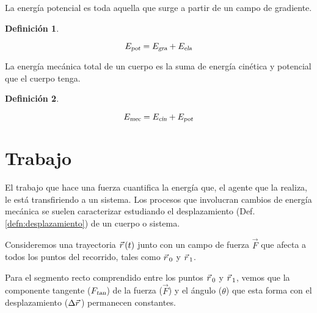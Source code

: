 \documentclass[a5paper,12pt,twoside]{book}
\newtheorem{defn}{{Definición}}[chapter]
\begin{document}
La energía potencial es toda aquella que surge a partir de un campo de gradiente.

\begin{mdframed}[style=MyFrame1]
    \begin{defn}
    \end{defn}
    \begin{equation*}
        {{E}_\textsl{{pot}}} = {{E}_\textsl{{gra}}} + {{E}_\textsl{{ela}}}
    \end{equation*}
\end{mdframed}

La energía mecánica total de un cuerpo es la suma de energía cinética y potencial que el cuerpo tenga.

\begin{mdframed}[style=MyFrame1]
    \begin{defn}
        \label{defn:mechanicEnergy}
    \end{defn}
    \begin{equation*}
        {{E}_\textsl{{mec}}} = {{E}_\textsl{{cin}}} + {{E}_\textsl{{pot}}}
    \end{equation*}
\end{mdframed}


\section{Trabajo}

El trabajo que hace una fuerza cuantifica la energía que, el agente que la realiza, le está transfiriendo a un sistema.
Los procesos que involucran cambios de energía mecánica se suelen caracterizar estudiando el desplazamiento (Def. \ref{defn:desplazamiento}) de un cuerpo o sistema.

Consideremos una trayectoria $\vec{r}\hspace{0.05cm}(t)$ junto con un campo de fuerza $\vec{F}$ que afecta a todos los puntos del recorrido, tales como $\vec{r}\hspace{0.05cm}_0$ y $\vec{r}\hspace{0.05cm}_1$.

\begin{center}
    \def\svgwidth{0.8\linewidth}
    
\end{center}

Para el segmento recto comprendido entre los puntos $\vec{r}\hspace{0.05cm}_0$ y $\vec{r}\hspace{0.05cm}_1$, vemos que la componente tangente (${{F}_\textsl{{tan}}}$) de la fuerza ($\vec{F}$) y el ángulo ($\theta$) que esta forma con el desplazamiento ($\Delta \vec{r}\hspace{0.05cm}$) permanecen constantes.

\begin{center}
    \def\svgwidth{0.6\linewidth}
    
\end{center}
\end{document}
